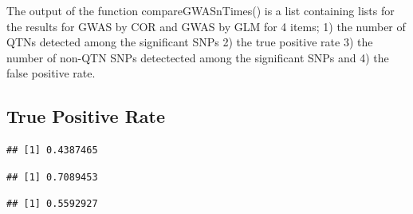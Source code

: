 \documentclass[
]{article}
\newenvironment{Shaded}{\begin{snugshade}}{\end{snugshade}}
\newcommand{\CommentTok}[1]{\textcolor[rgb]{0.56,0.35,0.01}{\textit{#1}}}
\newcommand{\DecValTok}[1]{\textcolor[rgb]{0.00,0.00,0.81}{#1}}
\newcommand{\KeywordTok}[1]{\textcolor[rgb]{0.13,0.29,0.53}{\textbf{#1}}}
\newcommand{\NormalTok}[1]{#1}
\newcommand{\OperatorTok}[1]{\textcolor[rgb]{0.81,0.36,0.00}{\textbf{#1}}}
\begin{document}
The output of the function compareGWASnTimes() is a list containing
lists for the results for GWAS by COR and GWAS by GLM for 4 items; 1)
the number of QTNs detected among the significant SNPs 2) the true
positive rate 3) the number of non-QTN SNPs detectected among the
significant SNPs and 4) the false positive rate.

\hypertarget{true-positive-rate}{%
\subsection{True Positive Rate}\label{true-positive-rate}}

\begin{Shaded}
\end{Shaded}

\begin{verbatim}
## [1] 0.4387465
\end{verbatim}

\begin{Shaded}
\end{Shaded}

\begin{verbatim}
## [1] 0.7089453
\end{verbatim}

\begin{Shaded}
\end{Shaded}

\begin{verbatim}
## [1] 0.5592927
\end{verbatim}

\begin{Shaded}
\end{Shaded}
\end{document}
